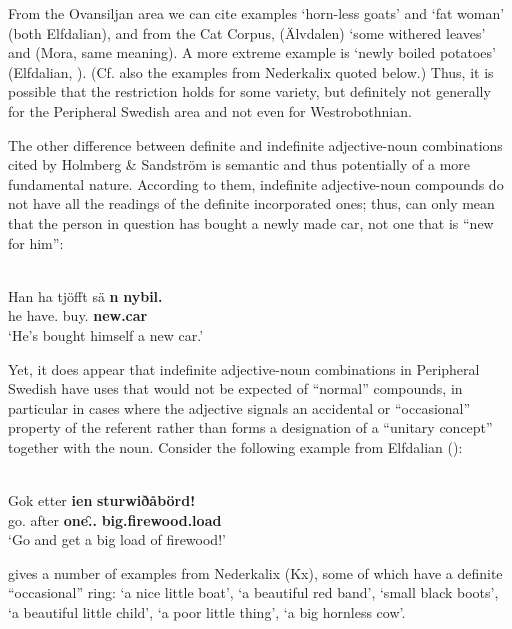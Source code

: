 From the Ovansiljan area we can cite \citet[52]{Levander1909} examples  ‘horn-less goats’ and  ‘fat woman’ (both Elfdalian), and from the Cat Corpus,  (Älvdalen) ‘some withered leaves’ and (Mora, same meaning). A more extreme example is \textbf{ }‘newly boiled potatoes’ (Elfdalian, \citet[201]{Åkerberg2012}). (Cf. also the examples from Nederkalix quoted below.) Thus, it is possible that the restriction holds for some variety, but definitely not generally for the Peripheral Swedish area and not even for Westrobothnian. 

The other difference between definite and indefinite adjective-noun combinations cited by Holmberg \& Sandström is semantic and thus potentially of a more fundamental nature. According to them, indefinite adjective-noun compounds do not have all the readings of the definite incorporated ones; thus,  can only mean that the person in question has bought a newly made car, not one that is “new for him”:

\ea\label{}
\\
\gll Han  ha  tjöfft  sä  \textbf{n}\textbf{  nybil.}\\
he  have.{\prs}  buy.{\sup}  {}  \textbf{{\indf}} \textbf{new.car}\\
\glt ‘He’s bought himself a new car.’
\z

Yet, it does appear that indefinite adjective-noun combinations in Peripheral Swedish have uses that would not be expected of “normal” compounds, in particular in cases where the adjective signals an accidental or “occasional” property of the referent rather than forms a designation of a “unitary concept” together with the noun. Consider the following example from Elfdalian (\citet[142]{Levander1909}):

\ea\label{}
\\
\gll Gok  etter  \textbf{ien} \textbf{sturwiðåbörd!}\\
go.{\imp}  after  \textbf{one.{\f}.{\dat}} \textbf{big.firewood.load}\\
\glt ‘Go and get a big load of firewood!’ 
\z

\citet[141]{Rutberg1924} gives a number of examples from Nederkalix (Kx), some of which have a definite “occasional” ring: ‘a nice little boat’,  ‘a beautiful red band’,  ‘small black boots’,  ‘a beautiful little child’,  ‘a poor little thing’,  ‘a big hornless cow’.

